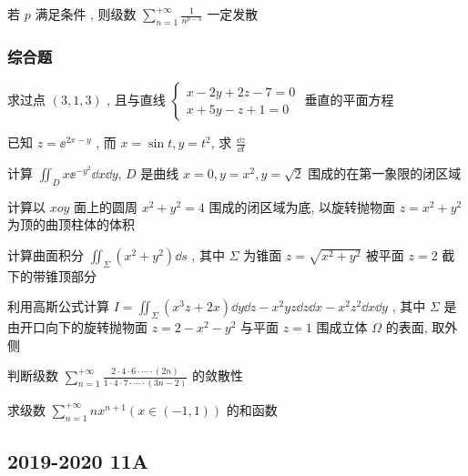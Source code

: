 \begin{ti}
	若 $p$ 满足条件 \hua{}, 则级数 $\sum_{n=1}^{+\infty}\frac{1}{n^{p-3}}$ 一定发散
\end{ti}

\subsubsection{综合题}
\begin{ti}
	求过点 $(3,1,3)$ , 且与直线 $
	\begin{cases}
		x-2y+2z-7=0\\
		x+5y-z+1=0
	\end{cases}
	$ 垂直的平面方程
\end{ti}

\begin{ti}
	已知 $z=\ee^{2x-y}$ , 而 $x=\sin t,y=t^2$, 求 $\frac{\dd{z}}{\dd{t}}$
\end{ti}

\begin{ti}
	计算 $\iint_{D} x\ee^{-y^2}\dd{x}\dd{y}$, $D$ 是曲线 $x=0,y=x^2,y=\sqrt{2}$ 围成的在第一象限的闭区域
\end{ti}

\begin{ti}
	计算以 $xoy$ 面上的圆周 $x^2+y^2=4$ 围成的闭区域为底, 以旋转抛物面 $z=x^2+y^2$ 为顶的曲顶柱体的体积
\end{ti}

\begin{ti}
	计算曲面积分 $\iint_{\Sigma}\left( x^2+y^2 \right)\dd{s}$ , 其中 $\Sigma$ 为锥面 $z=\sqrt{x^2+y^2}$ 被平面 $z=2$ 截下的带锥顶部分
\end{ti}

\begin{ti}
	利用高斯公式计算 $I=\iint_{\Sigma}\left( x^3 z+2x \right)\dd{y}\dd{z}-x^2 yz\dd{z}\dd{x}-x^2 z^2\dd{x}\dd{y}$ , 其中 $\Sigma$ 是由开口向下的旋转抛物面 $z=2-x^2-y^2$ 与平面 $z=1$ 围成立体 $\Omega$ 的表面, 取外侧
\end{ti}

\begin{ti}
	判断级数 $\sum_{n=1}^{+\infty}\frac{2\cdot 4\cdot 6\cdot\cdots\cdot (2n)}{1\cdot 4\cdot 7\cdot\cdots\cdot (3n-2)}$ 的敛散性
\end{ti}

\begin{ti}
	求级数 $\sum_{n=1}^{+\infty}nx^{n+1}(x\in(-1,1))$ 的和函数
\end{ti}

\subsection{2019-2020 11A}
